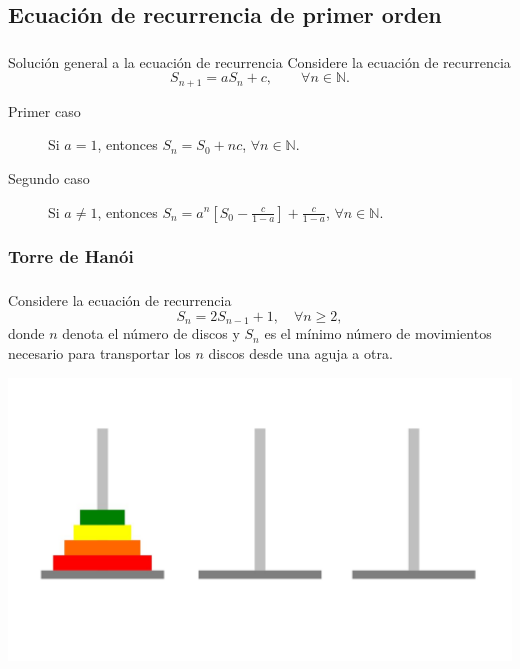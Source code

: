 \subsection{Ecuación de recurrencia de primer orden}

\begin{frame}
\frametitle{\subsecname}

\begin{block}{Solución general a la ecuación de recurrencia}
	Considere la ecuación de recurrencia \[ S_{n+1}=aS_{n}+c,\qquad\forall n\in\mathds{N}. \]
	\begin{description}
		\item[Primer caso] Si $a=1$, entonces $S_{n}= S_{0}+nc$, $\forall n\in \mathds{N}$.
		\item[Segundo caso] Si $a\neq1$, entonces $S_{n}=a^{n}\left[S_{0}-\frac{c}{1-a}\right]+\frac{c}{1-a}$, $\forall n\in\mathds{N}$.
	\end{description}
	\end{block}
\end{frame}

\subsubsection{Torre de Hanói}

\begin{frame}
\frametitle{\subsubsecname}

\begin{minipage}{0.45\paperwidth}
Considere la ecuación de recurrencia \[ S_{n}=2S_{n-1}+1,\quad\forall n\geq2, \] donde $n$ denota el número de discos y $S_{n}$ es el mínimo número de movimientos necesario para transportar los $n$ discos desde una aguja a otra.
\end{minipage}
\hfill
\begin{minipage}{0.45\paperwidth}
\includegraphics[width=0.4\paperwidth]{torre.jpg}
\end{minipage}
\end{frame}

